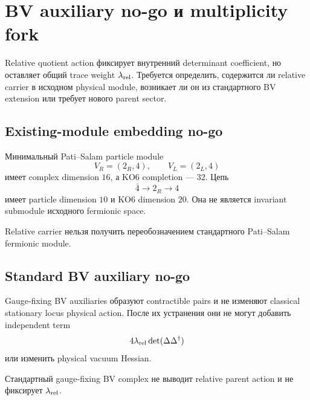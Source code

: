 \section{BV auxiliary no-go и multiplicity fork}

Relative quotient action фиксирует внутренний determinant coefficient, но
оставляет общий trace weight \(\lambda_{\rm rel}\). Требуется определить,
содержится ли relative carrier в исходном physical module, возникает ли он
из стандартного BV extension или требует нового parent sector.

\subsection{Existing-module embedding no-go}

Минимальный Pati--Salam particle module
\begin{equation}
 V_R=(2_R,4),\qquad V_L=(2_L,4)
\end{equation}
имеет complex dimension \(16\), а KO6 completion --- \(32\). Цепь
\begin{equation}
 \bar4\longrightarrow2_R\longrightarrow4
 \label{eq:ps-bv-relative-chain}
\end{equation}
имеет particle dimension \(10\) и KO6 dimension \(20\). Она не является
invariant submodule исходного fermionic space.

\begin{nogocriterion}
Relative carrier нельзя получить переобозначением стандартного
Pati--Salam fermionic module.
\end{nogocriterion}

\subsection{Standard BV auxiliary no-go}

Gauge-fixing BV auxiliaries образуют contractible pairs и не изменяют
classical stationary locus physical action. После их устранения они не могут
добавить independent term
\begin{equation}
 4\lambda_{\rm rel}\det(\Delta\Delta^\dagger)
\end{equation}
или изменить physical vacuum Hessian.

\begin{nogocriterion}
Стандартный gauge-fixing BV complex не выводит relative parent action и не
фиксирует \(\lambda_{\rm rel}\).
\end{nogocriterion}

